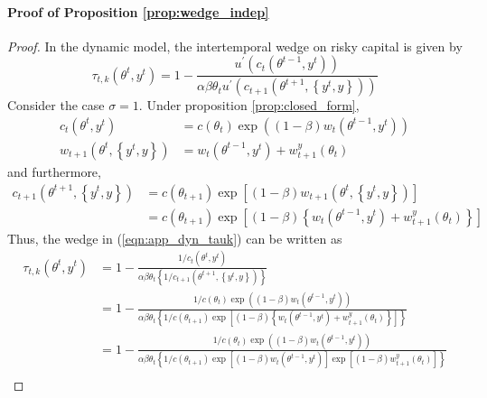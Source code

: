 \documentclass[11pt]{article}
\begin{document}
\paragraph{Proof of Proposition \ref{prop:wedge_indep}}
\begin{proof}
In the dynamic model, the intertemporal wedge on risky capital is given by 
\begin{equation}
    \tau_{t,k}\left(\theta^{t},y^{t}\right)=1-\frac{u^{\prime}\left(c_{t}\left(\theta^{t-1},y^{t}\right)\right)}{\alpha\beta\theta_{t}u^{\prime}\left(c_{t+1}\left(\theta^{t+1},\left\{ y^{t},y\right\} \right)\right)} \label{eqn:app_dyn_tauk}
\end{equation}
Consider the case \( \sigma = 1 \). Under proposition \ref{prop:closed_form}, 
\begin{align*}
    c_{t}\left(\theta^{t},y^{t}\right)&=c\left(\theta_{t}\right)\exp\left(\left(1-\beta\right)w_{t}\left(\theta^{t-1},y^{t}\right)\right)\\
    w_{t+1}\left(\theta^{t},\left\{ y^{t},y\right\} \right)&=w_{t}\left(\theta^{t-1},y^{t}\right)+w_{t+1}^{y}\left(\theta_{t}\right)
\end{align*}
and furthermore,
\begin{align*}
    c_{t+1}\left(\theta^{t+1},\left\{ y^{t},y\right\} \right)&=c\left(\theta_{t+1}\right)\exp\left[\left(1-\beta\right)w_{t+1}\left(\theta^{t},\left\{ y^{t},y\right\} \right)\right]\\
    &=c\left(\theta_{t+1}\right)\exp\left[\left(1-\beta\right)\left\{ w_{t}\left(\theta^{t-1},y^{t}\right)+w_{t+1}^{y}\left(\theta_{t}\right)\right\} \right]
\end{align*}
Thus, the wedge in (\ref{eqn:app_dyn_tauk}) can be written as 
\begin{align*}
    \tau_{t,k}\left(\theta^{t},y^{t}\right)&=1-\frac{1/c_{t}\left(\theta^{t},y^{t}\right)}{\alpha\beta\theta_{t}\left\{ 1/c_{t+1}\left(\theta^{t+1},\left\{ y^{t},y\right\} \right)\right\} }\\
    &=1-\frac{1/c\left(\theta_{t}\right)\exp\left(\left(1-\beta\right)w_{t}\left(\theta^{t-1},y^{t}\right)\right)}{\alpha\beta\theta_{t}\left\{ 1/c\left(\theta_{t+1}\right)\exp\left[\left(1-\beta\right)\left\{ w_{t}\left(\theta^{t-1},y^{t}\right)+w_{t+1}^{y}\left(\theta_{t}\right)\right\} \right]\right\} }\\
    &=1-\frac{1/c\left(\theta_{t}\right)\exp\left(\left(1-\beta\right)w_{t}\left(\theta^{t-1},y^{t}\right)\right)}{\alpha\beta\theta_{t}\left\{ 1/c\left(\theta_{t+1}\right)\exp\left[\left(1-\beta\right)w_{t}\left(\theta^{t-1},y^{t}\right)\right]\exp\left[\left(1-\beta\right)w_{t+1}^{y}\left(\theta_{t}\right)\right]\right\} }\\

\end{align*}
\end{proof}
\end{document}
